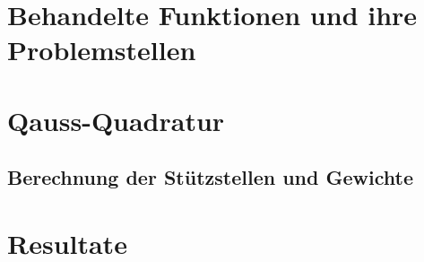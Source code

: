 \documentclass[12pt]{article}
\begin{document}
\newpage

\section{Behandelte Funktionen und ihre Problemstellen}


\newpage

\section{Qauss-Quadratur}
\subsection{Berechnung der Stützstellen und Gewichte}

\newpage

\section{Resultate}

\newpage
\end{document}
